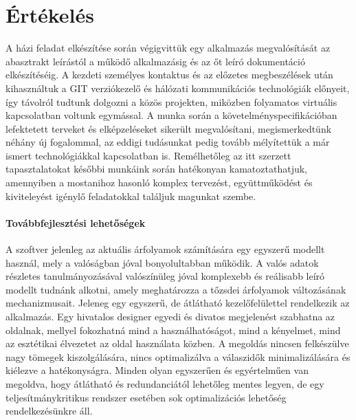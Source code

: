\chapter*{Értékelés}\label{sect:ertekeles}

A házi feladat elkészítése során végigvittük egy alkalmazás megvalósítását az abasztrakt leírástól a működő alkalmazásig és az őt leíró dokumentáció elkészítéséig. A kezdeti személyes kontaktus és az előzetes megbeszélések után kihasználtuk a GIT verziókezelő és hálózati kommunikációs technológiák előnyeit, így távolról tudtunk dolgozni a közös projekten, miközben folyamatos virtuális kapcsolatban voltunk egymással. A munka során a követelményspecifikációban lefektetett terveket és elképzeléseket sikerült megvalósítani, megismerkedtünk néhány új fogalommal, az eddigi tudásunkat pedig tovább mélyítettük a már ismert technológiákkal kapcsolatban is. Remélhetőleg az itt szerzett tapasztalatokat későbbi munkáink során hatékonyan kamatoztathatjuk, amennyiben a mostanihoz hasonló komplex tervezést, együttműködést és kiviteleyést igénylő feladatokkal találjuk magunkat szembe.

\subsubsection{Továbbfejlesztési lehetőségek}\label{sect:tovabbfejlesztes}

A szoftver jelenleg az aktuális árfolyamok számítására egy egyszerű modellt használ, mely a valóságban jóval bonyolultabban működik. A valós adatok részletes tanulmányozásával valószínüleg jóval komplexebb és reálisabb leíró modellt tudnánk alkotni, amely meghatározza a tőzsdei árfolyamok változásának mechanizmusait. 
Jeleneg egy egyszerű, de átlátható kezelőfelülettel rendelkezik az alkalmazás. Egy hivatalos designer egyedi és divatos megjelenést szabhatna az oldalnak, mellyel fokozhatná mind a használhatóságot, mind a kényelmet, mind az esztétikai élvezetet az oldal használata közben.
A megoldás nincsen felkészülve nagy tömegek kiszolgálására, nincs optimalizálva a válaszidők minimalizálására és kiélezve a hatékonyságra. Minden olyan egyszerűen és egyértelműen van megoldva, hogy átlátható és redundanciától lehetőleg mentes legyen, de egy teljesítmánykritikus rendszer esetében sok optimalizációs lehetőség rendelkezésünkre áll. 